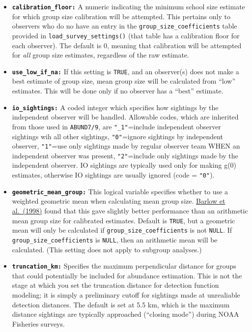 \documentclass[
]{book}
\begin{document}
\begin{itemize}
\item
  \textbf{\texttt{calibration\_floor:}} A numeric indicating the minimum school size estimate for which group size calibration will be attempted. This pertains only to observers who do no have an entry in the \texttt{group\_size\_coefficients} table provided in \texttt{load\_survey\_settings()} (that table has a calibration floor for each observer). The default is 0, meaning that calibration will be attempted for \emph{all} group size estimates, regardless of the raw estimate.
\item
  \textbf{\texttt{use\_low\_if\_na:}} If this setting is \texttt{TRUE}, and an observer(s) does not make a best estimate of group size, mean group size will be calculated from ``low'' estimates. This will be done only if no observer has a ``best'' estimate.
\item
  \textbf{\texttt{io\_sightings:}} A coded integer which specifies how sightings by the independent observer will be handled. Allowable codes, which are inherited from those used in \texttt{ABUND7/9}, are \texttt{"\_1"}=include independent observer sightings wih all other sightings, \texttt{"0"}=ignore sightings by independent observer, \texttt{"1"}=use only sightings made by regular observer team WHEN an independent observer was present, \texttt{"2"}=include only sightings made by the independent observer. IO sightings are typically used only for making g(0) estimates, otherwise IO sightings are usually ignored (code = \texttt{"0"}).
\item
  \textbf{\texttt{geometric\_mean\_group:}} This logical variable specifies whether to use a weighted geometric mean when calculating mean group size. \href{https://repository.library.noaa.gov/view/noaa/25848}{Barlow et al.~(1998)} found that this gave slightly better performance than an arithmetic mean group size for calibrated estimates. Default is \texttt{TRUE}, but a geometric mean will only be calculated if \texttt{group\_size\_coefficients} is not \texttt{NULL}. If \texttt{group\_size\_coefficients} is \texttt{NULL}, then an arithmetic mean will be calculated. (This setting does not apply to subgroup analyses.)
\item
  \textbf{\texttt{truncation\_km:}} Specifies the maximum perpendicular distance for groups that could potentially be included for abundance estimation. This is not the stage at which you set the truncation distance for detection function modeling; it is simply a preliminary cutoff for sightings made at unrealiable detection distances. The default is set at 5.5 km, which is the maximum distance sightings are typically approached (``closing mode'') during NOAA Fisheries surveys.

\end{itemize}
\end{document}
